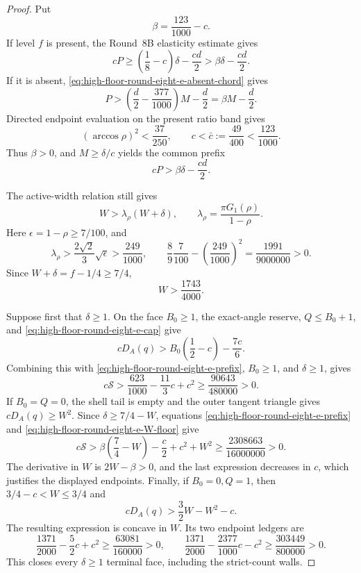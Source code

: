 \documentclass[11pt]{article}
\theoremstyle{remark}
\begin{document}
\begin{proof}
Put
\[
 \beta=\frac{123}{1000}-c.
\]
If level $f$ is present, the Round~8B elasticity estimate gives
\[
 cP\geq\left(\frac18-c\right)\delta-\frac{cd}{2}
 >\beta\delta-\frac{cd}{2}.
\]
If it is absent, \eqref{eq:high-floor-round-eight-e-absent-chord} gives
\[
 P>\left(\frac d2-\frac{377}{1000}\right)M-\frac d2
   =\beta M-\frac d2.
\]
Directed endpoint evaluation on the present ratio band gives
\begin{equation}
 (\arccos\rho)^2<\frac{37}{250},\qquad
 c<\bar c:=\frac{49}{400}<\frac{123}{1000}.
 \label{eq:high-floor-round-eight-e-ratio}
\end{equation}
Thus $\beta>0$, and $M\geq\delta/c$ yields the common prefix
\begin{equation}
 \boxed{cP>\beta\delta-\frac{cd}{2}.}
 \label{eq:high-floor-round-eight-e-prefix}
\end{equation}

The active-width relation still gives
\[
 W>\lambda_\rho(W+\delta),\qquad
 \lambda_\rho=\frac{\pi G_1(\rho)}{1-\rho}.
\]
Here $\epsilon=1-\rho\geq7/100$, and
\[
 \lambda_\rho>\frac{2\sqrt2}{3}\sqrt\epsilon
 >\frac{249}{1000},
 \qquad
 \frac89\frac7{100}-\left(\frac{249}{1000}\right)^2
 =\frac{1991}{9000000}>0.
\]
Since $W+\delta=f-1/4\geq7/4$,
\begin{equation}
 \boxed{W>\frac{1743}{4000}.}
 \label{eq:high-floor-round-eight-e-W-floor}
\end{equation}

Suppose first that $\delta\geq1$.  On the face $B_0\geq1$, the
exact-angle reserve, $Q\leq B_0+1$, and
\eqref{eq:high-floor-round-eight-e-cap} give
\[
 cD_A(q)>
 B_0\left(\frac12-c\right)-\frac{7c}{6}.
\]
Combining this with \eqref{eq:high-floor-round-eight-e-prefix},
$B_0\geq1$, and $\delta\geq1$, gives
\begin{equation}
 c\mathcal S>
 \frac{623}{1000}-\frac{11}{3}c+c^2
 \geq\frac{90643}{480000}>0.
 \label{eq:high-floor-round-eight-e-B-positive}
\end{equation}
If $B_0=Q=0$, the shell tail is empty and the outer tangent triangle
gives $cD_A(q)\geq W^2$.  Since
$\delta\geq7/4-W$, equations
\eqref{eq:high-floor-round-eight-e-prefix} and
\eqref{eq:high-floor-round-eight-e-W-floor} give
\begin{equation}
 c\mathcal S>
 \beta\left(\frac74-W\right)-\frac c2+c^2+W^2
 \geq\frac{2308663}{16000000}>0.
 \label{eq:high-floor-round-eight-e-Q-zero}
\end{equation}
The derivative in $W$ is $2W-\beta>0$, and the last expression
decreases in $c$, which justifies the displayed endpoints.  Finally,
if $B_0=0,Q=1$, then $3/4-c<W\leq3/4$ and
\[
 cD_A(q)>\frac32W-W^2-c.
\]
The resulting expression is concave in $W$.  Its two endpoint ledgers
are
\begin{equation}
 \frac{1371}{2000}-\frac52c+c^2
 \geq\frac{63081}{160000}>0,
 \qquad
 \frac{1371}{2000}-\frac{2377}{1000}c-c^2
 \geq\frac{303449}{800000}>0.
 \label{eq:high-floor-round-eight-e-Q-one}
\end{equation}
This closes every $\delta\geq1$ terminal face, including the
strict-count walls.


\end{proof}
\end{document}
